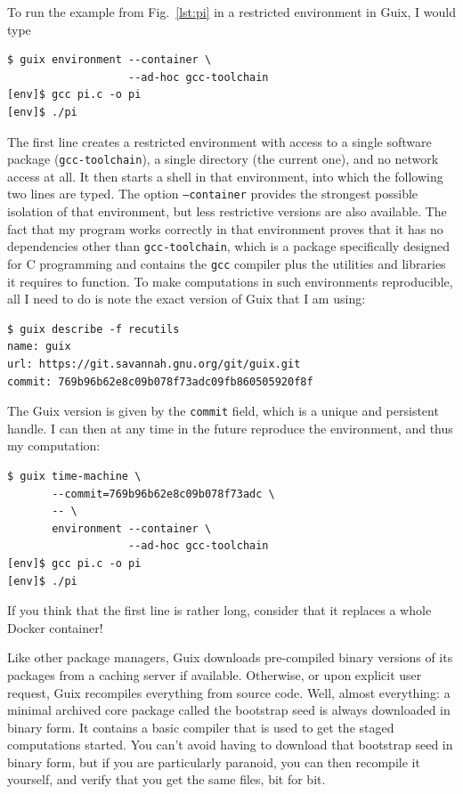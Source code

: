 \documentclass[10pt,journal,compsoc]{IEEEtran}
\begin{document}
To run the example from Fig.~\ref{lst:pi} in a restricted environment in Guix, I would type
\begin{verbatim}
$ guix environment --container \
                   --ad-hoc gcc-toolchain
[env]$ gcc pi.c -o pi
[env]$ ./pi
\end{verbatim}
The first line creates a restricted environment with access to a single software package (\texttt{gcc-toolchain}), a single directory (the current one), and no network access at all. It then starts a shell in that environment, into which the following two lines are typed. The option \texttt{--container} provides the strongest possible isolation of that environment, but less restrictive versions are also available. The fact that my program works correctly in that environment proves that it has no dependencies other than \texttt{gcc-toolchain}, which is a package specifically designed for C programming and contains the \texttt{gcc} compiler plus the utilities and libraries it requires to function. 
To make computations in such environments reproducible, all I need to do is note the exact version of Guix that I am using:
\begin{verbatim}
$ guix describe -f recutils
name: guix
url: https://git.savannah.gnu.org/git/guix.git
commit: 769b96b62e8c09b078f73adc09fb860505920f8f
\end{verbatim}
The Guix version is given by the \texttt{commit} field, which is a unique and persistent handle. I can then at any time in the future reproduce the environment, and thus my computation:
\begin{verbatim}
$ guix time-machine \
       --commit=769b96b62e8c09b078f73adc \
       -- \
       environment --container \
                   --ad-hoc gcc-toolchain
[env]$ gcc pi.c -o pi
[env]$ ./pi
\end{verbatim}
If you think that the first line is rather long, consider that it replaces a whole Docker container!

Like other package managers, Guix downloads pre-compiled binary versions of its packages from a caching server if available. Otherwise, or upon explicit user request, Guix recompiles everything from source code. Well, almost everything: a minimal archived core package called the bootstrap seed is always downloaded in binary form. It contains a basic compiler that is used to get the staged computations started. You can't avoid having to download that bootstrap seed in binary form, but if you are particularly paranoid, you can then recompile it yourself, and verify that you get the same files, bit for bit.
\end{document}
